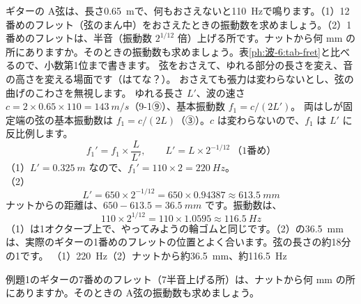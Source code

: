 \label{ph:波-6:ex1}
\begin{phreidai}[ギターのフレット]
ギターの A弦は、長さ\qty{0.65}{m}で、何もおさえないと\qty{110}{Hz}で鳴ります。（1）12番めのフレット（弦のまん中）をおさえたときの振動数を求めましょう。（2）1番めのフレットは、半音（振動数 $2^{1/12}$ 倍）上げる所です。ナットから何 mm の所にありますか。そのときの振動数も求めましょう。表\ref{ph:波-6:tab-fret}と比べるので、小数第1位まで書きます。
\phbamen
弦をおさえて、ゆれる部分の長さを変え、音の高さを変える場面です（はてな？）。
\phmushi
おさえても張力は変わらないとし、弦の曲げのこわさを無視します。
\phzu
ゆれる長さ $L'$、波の速さ $c=2\times0.65\times110=\qty{143}{m/s}$（9-1⑨）、基本振動数 $f_1=c/(2L')$。
\phriyu
両はしが固定端の弦の基本振動数は $f_1=c/(2L)$（③）。$c$ は変わらないので、$f_1$ は $L'$ に反比例します。
\phtateru
\[f_1'=f_1\times\frac{L}{L'},\qquad L'=L\times2^{-1/12}\ \text{（1番め）}\]
\phtoku
（1）$L'=\qty{0.325}{m}$ なので、$f_1'=110\times2=\qty{220}{Hz}$。\\
（2）\[L'=650\times2^{-1/12}=650\times0.94387\approx\qty{613.5}{mm}\]
ナットからの距離は、$650-613.5=\qty{36.5}{mm}$ です。振動数は、
\[110\times2^{1/12}=110\times1.0595\approx\qty{116.5}{Hz}\]
\phtashikame
（1）は1オクターブ上で、やってみようの輪ゴムと同じです。（2）の\qty{36.5}{mm}は、実際のギターの1番めのフレットの位置とよく合います。弦の長さの約18分の1です。
\kotae （1）\qty{220}{Hz}（2）ナットから約\qty{36.5}{mm}、約\qty{116.5}{Hz}
\end{phreidai}
\begin{jibun}
例題1のギターの7番めのフレット（7半音上げる所）は、ナットから何 mm の所にありますか。そのときの A弦の振動数も求めましょう。
\end{jibun}

